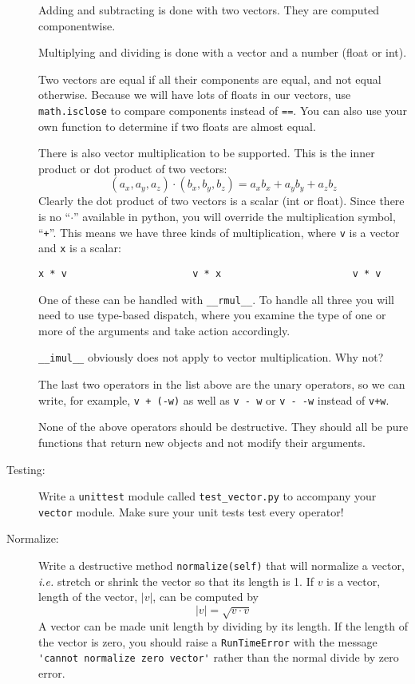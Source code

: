 \documentclass[12pt]{article}
\begin{document}
\begin{description}
Adding and subtracting is done with two vectors.
They are computed componentwise.

Multiplying and dividing is done with a vector
and a number (float or int).

Two vectors are equal
if all their components are equal, and not
equal otherwise.  Because we will have
lots of floats in our vectors, use \lstinline{math.isclose}
to compare components instead of \lstinline{==}.
You can also use your own function to 
determine if two floats are almost equal.

There is also vector multiplication to be supported.
This is the inner product or dot product
of two vectors:
\[
(a_x, a_y, a_z) \cdot (b_x, b_y, b_z) = a_xb_x + a_yb_y + a_zb_z
\]
Clearly the dot product of two vectors is a scalar
(int or float).  Since there is no ``$\cdot$'' available
in python, you will override the multiplication
symbol, ``{\tt +}''.  This means we have three kinds
of multiplication, where {\tt v} is a vector and {\tt x}
is a scalar:
\begin{lstlisting}
x * v                      v * x                       v * v
\end{lstlisting}
One of these can be handled with \lstinline{__rmul__}.
To handle all three you will need to use type-based
dispatch, where you examine the type of one or more
of the arguments and take action accordingly.

\lstinline{__imul__} obviously does not apply
to vector multiplication.  Why not?

The last two operators in the list above
are the unary operators, so we can write,
for example, \lstinline{v + (-w)} as well as \lstinline{v - w}
or \lstinline{v - -w} instead of \lstinline{v+w}.

None of the above operators should be destructive.
They should all be pure functions
that return new objects and not modify
their arguments.

\item[Testing:]  Write a \lstinline{unittest}
module called \lstinline{test_vector.py}
to accompany your \lstinline{vector}
module.  Make sure your unit tests test every operator!

\item[Normalize:]  Write a destructive method
\lstinline{normalize(self)}
that will normalize a vector, {\em i.e.} stretch
or shrink the vector so that its length is 1.
If $v$ is a vector, length of 
the  vector, $|v|$, can be computed by
\[
|v| = \sqrt{v\cdot v}
\]
A vector can be made unit length by dividing by its
length.  If the length of the vector is zero,
you should raise a \lstinline{RunTimeError}
with the message \lstinline{'cannot normalize zero vector'}
rather than the normal divide by zero error.


\end{description}
\end{document}
